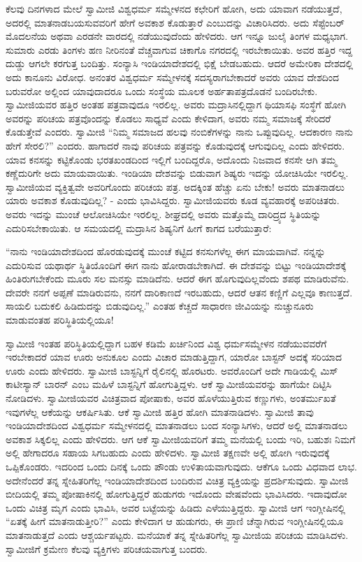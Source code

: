  ಕೆಲವು ದಿನಗಳಾದ ಮೇಲೆ ಸ್ವಾಮೀಜಿ ವಿಶ್ವಧರ್ಮ ಸಮ್ಮೇಳನದ ಕಛೇರಿಗೆ ಹೋಗಿ, ಅದು ಯಾವಾಗ ನಡೆಯುತ್ತದೆ, ಅದರಲ್ಲಿ ಮಾತನಾಡಬಯಸುವವರಿಗೆ ಹೇಗೆ ಅವಕಾಶ ಕೊಡುತ್ತಾರೆ ಎಂಬುದನ್ನು ವಿಚಾರಿಸಿದರು. ಅದು ಸೆಪ್ಟೆಂಬರ್ ಮೊದಲನೆಯ ಅಥವಾ ಎರಡನೇ ವಾರದಲ್ಲಿ ನಡೆಯುವುದೆಂದು ಹೇಳಿದರು. ಆಗ ಇನ್ನೂ ಜುಲೈ ತಿಂಗಳ ಮಧ್ಯಭಾಗ. ಸುಮಾರು ಎರಡು ತಿಂಗಳು ಹಣ ನೀರಿನಂತೆ ವೆಚ್ಚವಾಗುವ ಚಿಕಾಗೊ ನಗರದಲ್ಲಿ ಇರಬೇಕಾಯಿತು. ಅವರ ಹತ್ತಿರ ಇದ್ದ ದುಡ್ಡು ಆಗಲೇ ಕರಗುತ್ತ ಬಂದಿತ್ತು. ಸಂನ್ಯಾಸಿ ಇಂಡಿಯಾದೇಶದಲ್ಲಿ ಭಿಕ್ಷೆ ಬೇಡಬಹುದು. ಆದರೆ ಅಮೇರಿಕಾ ದೇಶದಲ್ಲಿ ಅದು ಕಾನೂನು ವಿರೋಧ. ಅನಂತರ ವಿಶ್ವಧರ್ಮ ಸಮ್ಮೇಳನಕ್ಕೆ ಸದಸ್ಯರಾಗಬೇಕಾದರೆ ಅವರು ಯಾವ ದೇಶದಿಂದ ಬರುವರೋ ಅಲ್ಲಿಂದ ಯಾವುದಾದರೂ ಒಂದು ಸಂಸ್ಥೆಯ ಮೂಲಕ ಅರ್ಹತಾಪತ್ರದೊಡನೆ ಬಂದಿರಬೇಕು. ಸ್ವಾಮೀಜಿಯವರ ಹತ್ತಿರ ಅಂತಹ ಪತ್ರವಾವುದೂ ಇರಲಿಲ್ಲ. ಅವರು ಮದ್ರಾಸಿನಲ್ಲಿದ್ದಾಗ ಥಿಯಾಸಫಿ ಸಂಸ್ಥೆಗೆ ಹೋಗಿ ಅವರನ್ನು ಪರಿಚಯ ಪತ್ರವೊಂದನ್ನು ಕೊಡಲು ಸಾಧ್ಯವೆ ಎಂದು ಕೇಳಿದಾಗ, ಅವರು ನಮ್ಮ ಸಮಾಜಕ್ಕೆ ಸೇರಿದರೆ ಕೊಡುತ್ತೇವೆ ಎಂದರು. ಸ್ವಾಮೀಜಿ “ನಿಮ್ಮ ಸಮಾಜದ ಹಲವು ನಂಬಿಕೆಗಳನ್ನು ನಾನು ಒಪ್ಪುವುದಿಲ್ಲ. ಆದಕಾರಣ ನಾನು ಹೇಗೆ ಸೇರಲಿ?” ಎಂದರು. ಹಾಗಾದರೆ ನಾವು ಪರಿಚಯ ಪತ್ರವನ್ನು ಕೊಡುವುದಕ್ಕೆ ಆಗುವುದಿಲ್ಲ ಎಂದು ಹೇಳಿದರು. ಯಾವ ಕನಸನ್ನು ಕಟ್ಟಿಕೊಂಡು ಭರತಖಂಡದಿಂದ ಇಲ್ಲಿಗೆ ಬಂದಿದ್ದರೊ, ಅದೊಂದು ನಿಜವಾದ ಕನಸೇ ಆಗಿ ತಮ್ಮ ಕಣ್ಣೆದುರಿಗೇ ಅದು ಮಾಯವಾಯಿತು. ಇಂಡಿಯಾ ದೇಶವನ್ನು ಬಿಡುವಾಗ ಶಿಷ್ಯರು ಇದನ್ನು ಯೋಚಿಸಿಯೇ ಇರಲಿಲ್ಲ. ಸ್ವಾಮೀಜಿಯವ ವ್ಯಕ್ತಿತ್ವವೇ ಅವರಿಗೊಂದು ಪರಿಚಯ ಪತ್ರ. ಅದಕ್ಕಿಂತ ಹೆಚ್ಚು ಏನು ಬೇಕು! ಅವರು ಮಾತನಾಡಲು ಯಾರು ಅವಕಾಶ ಕೊಡುವುದಿಲ್ಲ? - ಎಂದು ಭಾವಿಸಿದ್ದರು. ಸ್ವಾಮೀಜಿಯವರು ಕೂಡ ವ್ಯವಹಾರಕ್ಕೆ ಅಪರಿಚಿತರು. ಅವರು ಇದನ್ನು ಮುಂಚೆ ಆಲೋಚಿಸಿಯೇ ಇರಲಿಲ್ಲ. ಶೀಘ್ರದಲ್ಲಿ ಅವರು ಮತ್ತೊಮ್ಮೆ ದಾರಿದ್ರ್ಯದ ಸ್ಥಿತಿಯನ್ನು ಎದುರಿಸಬೇಕಾಯಿತು. ಆ ಸಮಯದಲ್ಲಿ ಮದ್ರಾಸಿನ ಶಿಷ್ಯನಿಗೆ ಹೀಗೆ ಕಾಗದ ಬರೆಯುತ್ತಾರೆ: 

 “ನಾನು ಇಂಡಿಯಾದೇಶದಿಂದ ಹೊರಡುವುದಕ್ಕೆ ಮುಂಚೆ ಕಟ್ಟಿದ ಕನಸುಗಳೆಲ್ಲ ಈಗ ಮಾಯವಾಗಿವೆ. ನನ್ನನ್ನು ಎದುರಿಸುವ ಯಥಾರ್ಥ ಸ್ಥಿತಿಯೊಂದಿಗೆ ಈಗ ನಾನು ಹೋರಾಡಬೇಕಾಗಿದೆ. ಈ ದೇಶವನ್ನು ಬಿಟ್ಟು ಇಂಡಿಯಾದೇಶಕ್ಕೆ ಹಿಂತಿರುಗಬೇಕೆಂದು ಮೂರು ಸಲ ಮನಸ್ಸು ಮಾಡಿದೆನು. ಆದರೆ ಈಗ ಹೊಗುವುದಿಲ್ಲವೆಂದು ಶಪಥ ಮಾಡಿರುವೆನು. ದೇವರೇ ನನಗೆ ಅಪ್ಪಣೆ ಮಾಡಿರುವನು, ನನಗೆ ದಾರಿಕಾಣದೆ ಇರಬಹುದು, ಆದರೆ ಆತನ ಕಣ್ಣಿಗೆ ಎಲ್ಲವೂ ಕಾಣುತ್ತದೆ. ಸಾಯಲಿ ಬದುಕಲಿ ಹಿಡಿದುದನ್ನು ಬಿಡುವುದಿಲ್ಲ.” ಎಂತಹ ಕೆಚ್ಚದೆ ಸಾಧಾರಣ ಜೀವಿಯನ್ನು ನುಚ್ಚುನೂರು ಮಾಡುವಂತಹ ಪರಿಸ್ಥಿತಿಯಲ್ಲಿಯೂ! 

 ಸ್ವಾಮೀಜಿ ಇಂತಹ ಪರಿಸ್ಥಿತಿಯಲ್ಲಿದ್ದಾಗ ಬಹಳ ಕಡಿಮೆ ಖರ್ಚಿನಿಂದ ವಿಶ್ವ ಧರ್ಮಸಮ್ಮೇಳನ ನಡೆಯುವವರೆಗೆ ಇರಬೇಕಾದರೆ ಯಾವ ಊರು ಅನುಕೂಲ ಎಂದು ವಿಚಾರ ಮಾಡುತ್ತಿದ್ದಾಗ, ಯಾರೋ ಬಾಸ್ಟನ್ ಅದಕ್ಕೆ ಸರಿಯಾದ ಊರು ಎಂದು ಹೇಳಿದರು. ಸ್ವಾಮೀಜಿ ಬಾಸ್ಟನ್ನಿಗೆ ರೈಲಿನಲ್ಲಿ ಹೊರಟರು. ಅವರೊಂದಿಗೆ ಅದೇ ಗಾಡಿಯಲ್ಲಿ ಮಿಸ್ ಕಾಟೀಸ್ಯಾನ್ ಬಾರನ್ ಎಂಬ ಮಹಿಳೆ ಬಾಸ್ಟನ್ನಿಗೆ ಹೋಗುತ್ತಿದ್ದಳು. ಆಕೆ ಸ್ವಾಮೀಜಿಯವರನ್ನು ಹಾಗೆಯೇ ದಿಟ್ಟಿಸಿ ನೋಡಿದಳು. ಸ್ವಾಮೀಜಿಯವರ ವಿಚಿತ್ರವಾದ ಪೋಷಾಕು, ಅವರ ಹೊಳೆಯುತ್ತಿರುವ ಕಣ್ಣುಗಳು, ಅಂತರ್ಮುಖತೆ ಇವುಗಳೆಲ್ಲ ಆಕೆಯನ್ನು ಆಕರ್ಷಿಸಿತು. ಆಕೆ ಸ್ವಾಮೀಜಿ ಹತ್ತಿರ ಹೋಗಿ ಮಾತನಾಡಿದಳು. ಸ್ವಾಮೀಜಿ ತಾವು ಇಂಡಿಯಾದೇಶದಿಂದ ವಿಶ್ವಧರ್ಮ ಸಮ್ಮೇಳನದಲ್ಲಿ ಮಾತನಾಡಲು ಬಂದ ಸಂನ್ಯಾಸಿಗಳು, ಆದರೆ ಅಲ್ಲಿ ಮಾತನಾಡಲು ಅವಕಾಶ ಸಿಕ್ಕಲಿಲ್ಲ ಎಂದು ಹೇಳಿದರು. ಆಗ ಆಕೆ ಸ್ವಾಮೀಜಿಯವರಿಗೆ ತಮ್ಮ ಮನೆಯಲ್ಲಿ ಬಂದು ಇರಿ, ಬಹುಶಃ ನಿಮಗೆ ಅಲ್ಲಿ ಹೇಗಾದರೂ ಸಹಾಯ ಸಿಗಬಹುದು ಎಂದು ಹೇಳಿದಳು. ಸ್ವಾಮೀಜಿ ತಕ್ಷಣವೇ ಅಲ್ಲಿ ಹೋಗಿ ಇರುವುದಕ್ಕೆ ಒಪ್ಪಿಕೊಂಡರು. ಇದರಿಂದ ಒಂದು ದಿನಕ್ಕೆ ಒಂದು ಪೌಂಡು ಉಳಿತಾಯವಾಗುವುದು. ಆಕೆಗೂ ಒಂದು ವಿಧವಾದ ಲಾಭ. ಅದೇನೆಂದರೆ ತನ್ನ ಸ್ನೇಹಿತರಿಗೆಲ್ಲ ಇಂಡಿಯಾದೇಶದಿಂದ ಬಂದಿರುವ ವಿಚಿತ್ರ ವ್ಯಕ್ತಿಯನ್ನು ಪ್ರದರ್ಶಿಸುವುದು. ಸ್ವಾಮೀಜಿ ಬೀದಿಯಲ್ಲಿ ತಮ್ಮ ಪೋಷಾಕಿನಲ್ಲಿ ಹೋಗುತ್ತಿದ್ದರೆ ಹುಡುಗರು ಇದೊಂದು ವೇಷವೆಂದು ಭಾವಿಸಿದರು. ಇದಾವುದೋ ಒಂದು ವಿಚಿತ್ರ ಮೃಗ ಎಂದು ಭಾವಿಸಿ, ಅವರ ಬಟ್ಟೆಯನ್ನು ಹಿಡಿದು ಎಳೆಯುತ್ತಿದ್ದರು. ಸ್ವಾಮೀಜಿ ಆಗ ಇಂಗ್ಲೀಷಿನಲ್ಲಿ “ಏತಕ್ಕೆ ಹೀಗೆ ಮಾತನಾಡುತ್ತೀರಿ?” ಎಂದು ಕೇಳಿದಾಗ ಆ ಹುಡುಗರು, ಈ ಪ್ರಾಣಿ ಚೆನ್ನಾಗಿರುವ ಇಂಗ್ಲೀಷಿನಲ್ಲಿಯೂ ಮಾತನಾಡುತ್ತದೆ ಎಂದು ಆಶ್ಚರ್ಯಪಟ್ಟರು. ಮನೆಯಾಕೆ ತನ್ನ ಸ್ನೇಹಿತರಿಗೆಲ್ಲ ಸ್ವಾಮೀಜಿಯ ಪರಿಚಯ ಮಾಡಿಸಿದಳು. ಸ್ವಾಮೀಜಿಗೆ ಕ್ರಮೇಣ ಕೆಲವು ವ್ಯಕ್ತಿಗಳು ಪರಿಚಯವಾಗುತ್ತ ಬಂದರು. 

